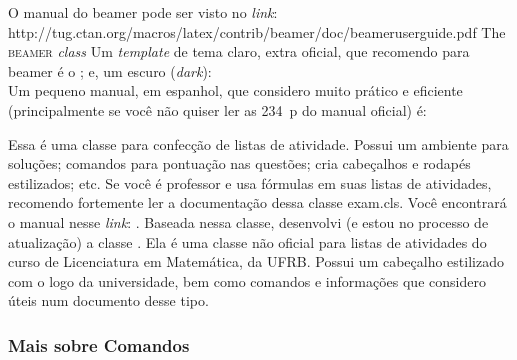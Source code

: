 \begin{description}
                   O manual do \textsf{beamer} pode ser visto no \textit{link}:
                   \hrefB
                   {
                     http://tug.ctan.org/macros/latex/contrib/beamer/doc/beameruserguide.pdf
                   }
                   {
                     The \textsc{beamer} \textit{class}
                   }
                   \newline
                   Um \textit{template} de tema claro, extra oficial, que 
                   recomendo para \textsf{beamer} é o 
                   ;
                   e, um escuro (\textit{dark}): 
                    \\
                   Um pequeno manual, em espanhol, que considero muito prático e 
                   eficiente (principalmente se você não quiser ler as 234~p do 
                   manual oficial) é: 
  \item[\textas{exam}] Essa é uma classe para confecção de listas de atividade.
                   Possui um ambiente para soluções; comandos para pontuação nas
                   questões; cria cabeçalhos e rodapés estilizados; etc.
                   Se você é professor e usa fórmulas em suas listas de 
                   atividades, recomendo fortemente ler a documentação dessa 
                   classe \textsf{exam.cls}.
                   Você encontrará o manual nesse \textit{link}:
                   .
                   \newline
                   Baseada nessa classe, desenvolvi (e estou no processo de 
                   atualização) a classe .
                   Ela é uma classe não oficial para listas de atividades do 
                   curso de Licenciatura em Matemática, da UFRB.
                   Possui um cabeçalho estilizado com o logo da universidade, bem
                   como comandos e informações que considero úteis num documento
                   desse tipo.
\end{description}

% 
  \subsubsection{Mais sobre Comandos}
% 

